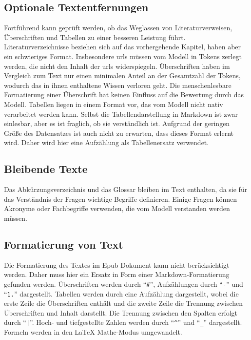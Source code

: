 \subsection{Optionale Textentfernungen}
Fortführend kann geprüft werden, ob das Weglassen von Literaturverweisen, Überschriften und Tabellen zu einer besseren Leistung führt.
Literaturverzeichnisse beziehen sich auf das vorhergehende Kapitel, haben aber ein schwieriges Format.
Insbesondere \ac{url}s müssen vom Modell in Tokens zerlegt werden, die nicht den Inhalt der \ac{url}s widerspiegeln.
Überschriften haben im Vergleich zum Text nur einen minimalen Anteil an der Gesamtzahl der Tokens, wodurch das in ihnen enthaltene Wissen verloren geht.
Die menschenlesbare Formatierung einer Überschrift hat keinen Einfluss auf die Bewertung durch das Modell.
Tabellen liegen in einem Format vor, das vom Modell nicht nativ verarbeitet werden kann.
Selbst die Tabellendarstellung in Markdown ist zwar einlesbar, aber es ist fraglich, ob sie verständlich ist.
Aufgrund der geringen Größe des Datensatzes ist auch nicht zu erwarten, dass dieses Format erlernt wird.
Daher wird hier eine Aufzählung als Tabellenersatz verwendet.

\subsection{Bleibende Texte}
Das Abkürzungsverzeichnis und das Glossar bleiben im Text enthalten, da sie für das Verständnis der Fragen wichtige Begriffe definieren.
Einige Fragen können Akronyme oder Fachbegriffe verwenden, die vom Modell verstanden werden müssen.

\subsection{Formatierung von Text}
Die Formatierung des Textes im Epub-Dokument kann nicht berücksichtigt werden.
Daher muss hier ein Ersatz in Form einer Markdown-Formatierung gefunden werden.
Überschriften werden durch \enquote{\texttt{\#}}, Aufzählungen durch \enquote{\texttt{-}} und \enquote{\texttt{1.}} dargestellt.
Tabellen werden durch eine Aufzählung dargestellt, wobei die erste Zeile die Überschriften enthält und die zweite Zeile die Trennung zwischen Überschriften und Inhalt darstellt.
Die Trennung zwischen den Spalten erfolgt durch \enquote{\texttt{|}}.
Hoch- und tiefgestellte Zahlen werden durch \enquote{\texttt{\^}} und \enquote{\texttt{\_}} dargestellt.
Formeln werden in den \LaTeX{} Mathe-Modus umgewandelt.

